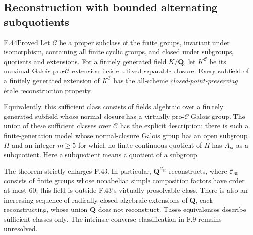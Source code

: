 \subsection{Reconstruction with bounded alternating subquotients}

\begin{claim}{F.44}{Proved}\label{clm:F44}
Let $\mathcal C$ be a proper subclass of the finite groups,
invariant under isomorphism, containing all finite cyclic groups,
and closed under subgroups, quotients and extensions.
For a finitely generated field $K/\mathbf Q$, let
$K^{\mathcal C}$ be its maximal Galois pro-$\mathcal C$ extension
inside a fixed separable closure.
Every subfield of a finitely generated extension of $K^{\mathcal C}$
has the all-scheme \emph{closed-point-preserving} \'etale
reconstruction property.

Equivalently, this sufficient class consists of fields algebraic
over a finitely generated subfield whose normal closure has a
virtually pro-$\mathcal C$ Galois group. The union of these
sufficient classes over $\mathcal C$ has the explicit description:
there is such a finite-generation model whose normal-closure
Galois group has an open subgroup $H$ and an integer $m\ge5$
for which no finite continuous quotient of $H$ has $A_m$ as
a subquotient. Here a subquotient means a quotient of a subgroup.

The theorem strictly enlarges F.43. In particular,
$\mathbf Q^{\mathcal C_{60}}$ reconstructs, where
$\mathcal C_{60}$ consists of finite groups whose nonabelian
simple composition factors have order at most $60$;
this field is outside F.43's virtually prosolvable class.
There is also an increasing sequence of radically closed
algebraic extensions of $\mathbf Q$, each reconstructing,
whose union $\overline{\mathbf Q}$ does not reconstruct.
These equivalences describe sufficient classes only.
The intrinsic converse classification in F.9 remains unresolved.
\end{claim}
